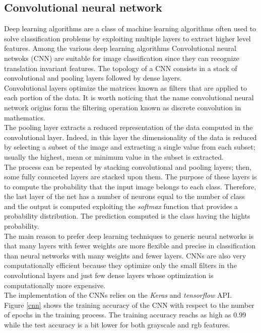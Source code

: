 \documentclass{article}
\begin{document}
\subsection{Convolutional neural network}
Deep learning algorithms are a class of machine learning algorithms often used to solve classification problems by exploiting multiple layers to extract higher level features. Among the various deep learning algorithms Convolutional neural netwoks (CNN) are suitable for image classification since they can recognize translation invariant features. The topology of a  CNN consists in a stack of convolutional and pooling layers followed by dense layers. \\
Convolutional layers optimize the matrices known as filters that are applied to each portion of the data. It is worth noticing that the name convolutional neural network origins form the filtering operation known as discrete convolution in mathematics. \\ 
The pooling layer extracts a reduced representation of the data computed in the convolutional layer. Indeed, in this layer the dimensionality of the data is reduced by selecting a subset of the image and extracting a single value from each subset; usually the highest, mean or minimum value in the subset is extracted. \\
The process can be repeated by stacking convolutional and pooling layers; then, some fully connceted layers are stacked upon them. The purpose of these layers is to compute the probability that the input image belongs to each class. Therefore, the last layer of the net has a number of neurons equal to the number of class and the output is computed exploiting the \textit{softmax} function that provides a probability distribution. The prediction computed is the class having the hights probability. \\
The main reason to prefer deep learning techniques  to generic neural networks is that many layers with fewer weights are more flexible and precise in classification than neural networks with many weights and fewer layers. CNNs are also very computationally efficient because they optimize only the small filters in the convolutional layers and just few dense layers whose optimization is computationally more expensive. \\
The implementation of the CNNs relies on the \textit{Keras} and \textit{tensorflow} API.\\
Figure \ref{cnn} shows the training accuracy of the CNN with respect to the number of epochs in the training process. The training accuracy reachs as high as 0.99 while the test accuracy is a bit lower for both grayscale and rgb features.
\end{document}
